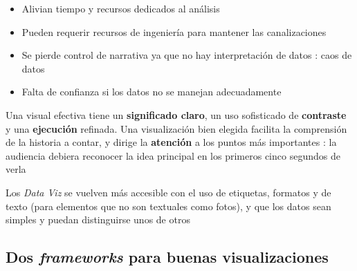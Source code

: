 \begin{itemize}
{\begin{description}
{\begin{itemize}
            \item {Alivian tiempo y recursos dedicados al análisis}
        \end{itemize}}
        \item[Contras]{
        \begin{itemize}
            \item {Pueden requerir recursos de ingeniería para mantener las canalizaciones}
            \item {Se pierde control de narrativa ya que no hay interpretación de datos : caos de datos}
            \item {Falta de confianza si los datos no se manejan adecuadamente}
        \end{itemize}
        }
    \end{description}}
\end{itemize}
Una visual efectiva tiene un \textbf{significado claro}, un uso sofisticado de \textbf{contraste} y una \textbf{ejecución} refinada. Una visualización bien elegida facilita la comprensión de la historia a contar, y dirige la \textbf{atención} a los puntos más importantes : la audiencia debiera reconocer la idea principal en los primeros cinco segundos de verla

Los \textit{Data Viz} se vuelven más accesible con el uso de etiquetas, formatos y de texto (para elementos que no son textuales como fotos), y que los datos sean simples y puedan distinguirse unos de otros





\subsection{Dos \textit{frameworks} para buenas visualizaciones}
